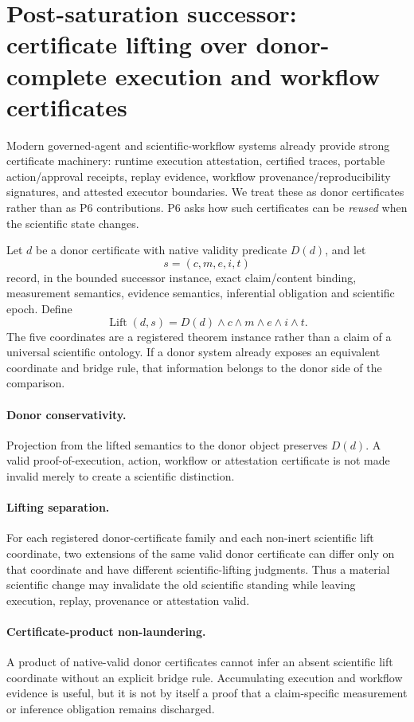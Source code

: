 \section{Post-saturation successor: certificate lifting over donor-complete execution and workflow certificates}

Modern governed-agent and scientific-workflow systems already provide strong certificate machinery: runtime execution attestation, certified traces, portable action/approval receipts, replay evidence, workflow provenance/reproducibility signatures, and attested executor boundaries. We treat these as donor certificates rather than as P6 contributions. P6 asks how such certificates can be \emph{reused} when the scientific state changes.

Let $d$ be a donor certificate with native validity predicate $D(d)$, and let
\[
s=(c,m,e,i,t)
\]
record, in the bounded successor instance, exact claim/content binding, measurement semantics, evidence semantics, inferential obligation and scientific epoch. Define
\[
\operatorname{Lift}(d,s)=D(d)\wedge c\wedge m\wedge e\wedge i\wedge t.
\]
The five coordinates are a registered theorem instance rather than a claim of a universal scientific ontology. If a donor system already exposes an equivalent coordinate and bridge rule, that information belongs to the donor side of the comparison.

\paragraph{Donor conservativity.}
Projection from the lifted semantics to the donor object preserves $D(d)$. A valid proof-of-execution, action, workflow or attestation certificate is not made invalid merely to create a scientific distinction.

\paragraph{Lifting separation.}
For each registered donor-certificate family and each non-inert scientific lift coordinate, two extensions of the same valid donor certificate can differ only on that coordinate and have different scientific-lifting judgments. Thus a material scientific change may invalidate the old scientific standing while leaving execution, replay, provenance or attestation valid.

\paragraph{Certificate-product non-laundering.}
A product of native-valid donor certificates cannot infer an absent scientific lift coordinate without an explicit bridge rule. Accumulating execution and workflow evidence is useful, but it is not by itself a proof that a claim-specific measurement or inference obligation remains discharged.

